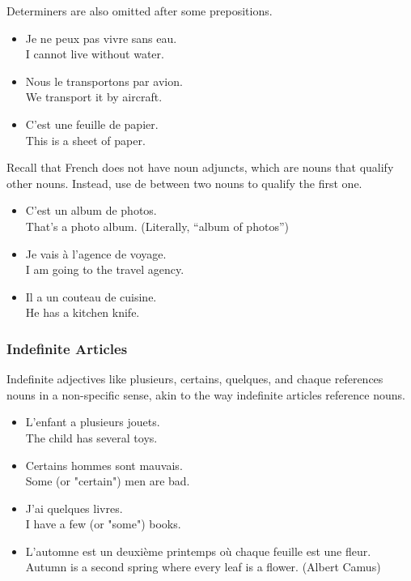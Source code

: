 Determiners are also omitted after some prepositions.

\begin{itemize}
  \item  Je ne peux pas vivre sans eau. \\ I cannot live without water.
  \item  Nous le transportons par avion. \\ We transport it by aircraft.
  \item  C'est une feuille de papier. \\ This is a sheet of paper.
\end{itemize}

Recall that French does not have noun adjuncts, which are nouns that qualify other nouns. Instead, use de between two nouns to qualify the first one.

\begin{itemize}
  \item  C'est un album de photos. \\ That's a photo album. (Literally, ``album of photos'')
  \item  Je vais {\`a} l'agence de voyage. \\ I am going to the travel agency.
  \item  Il a un couteau de cuisine. \\ He has a kitchen knife.
\end{itemize}

\subsubsection{Indefinite Articles}

Indefinite adjectives like plusieurs, certains, quelques, and chaque references nouns in a non-specific sense, akin to the way indefinite articles reference nouns.

\begin{itemize}
  \item  L'enfant a plusieurs jouets. \\ The child has several toys.
  \item  Certains hommes sont mauvais. \\ Some (or "certain") men are bad.
  \item  J'ai quelques livres. \\ I have a few (or "some") books.
  \item  L'automne est un deuxi{\`e}me printemps o{\`u} chaque feuille est une fleur. \\ Autumn is a second spring where every leaf is a flower. (Albert Camus)
\end{itemize}

